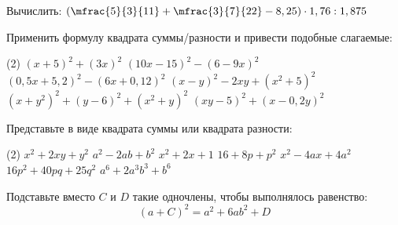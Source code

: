 \begin{homework}[number=3]
	\begin{listofex}
		\item Вычислить: \( \left( \mfrac{5}{3}{11} + \mfrac{3}{7}{22} - 8,25 \right) \cdot 1,76 : 1,875 \)
		\item Применить формулу квадрата суммы/разности и привести подобные слагаемые:
		\begin{tasks}(2)
			\task \( (x+5)^2+(3x)^2 \)
			\task \( (10x-15)^2-(6-9x)^2 \)
			\task \( (0,5x+5,2)^2-(6x+0,12)^2 \)
			\task \( (x-y)^2-2xy+(x^2+5)^2 \)
			\task \( (x+y^2)^2 + (y-6)^2 + (x^2+y)^2 \)
			\task  \( (xy-5)^2 + (x-0,2y)^2 \)
		\end{tasks}
		\item Представьте в виде квадрата суммы или квадрата разности:
		\begin{tasks}(2)
			\task \( x^2+2xy+y^2 \)
			\task \( a^2-2ab+b^2 \)
			\task \( x^2+2x+1 \)
			\task \( 16+8p+p^2 \)
			\task \( x^2-4ax+4a^2 \)
			\task \( 16p^2+40pq+25q^2 \)
			\task \( a^6+2a^3b^3+b^6 \)
		\end{tasks}
		\item Подставьте вместо \( C \) и \( D \) такие одночлены, чтобы выполнялось равенство:
		\[ (a + C)^2 = a^2 + 6ab^2 + D \]
	\end{listofex}
\end{homework}

